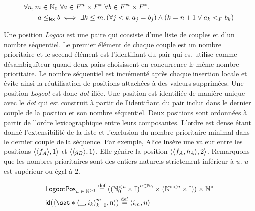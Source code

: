 \begin{equation*}\begin{split}
\MoveEqLeft \forall n, m \in \mathbb{N}_0\ \forall a \in F^n \times F^*\ \forall b \in F^m \times F^* \qsep\\
&a \leq_{\trm{lex}} b \iff \exists k \leq m \qsep (\forall j < k \qsep a_j = b_j) \land (k = n + 1 \lor a_k <_F b_k)
\end{split}\end{equation*}

Une position \emph{Logoot} est une paire qui consiste d'une liste de couples et d'un nombre séquentiel.
Le premier élément de chaque couple est un nombre prioritaire et le second élément est l'identifiant du pair qui est utilise comme désambiguïteur quand deux pairs choisissent en concurrence le même nombre prioritaire.
Le nombre séquentiel est incrémenté après chaque insertion locale et évite ainsi la réutilisation de positions attachées à des valeurs supprimées.
Une position \emph{Logoot} est donc \emph{dot}-ifiée.
Une position est identifiée de manière unique avec le \emph{dot} qui est construit à partir de l'identifiant du pair inclut dans le dernier couple de la position et son nombre séquentiel.
Deux positions sont ordonnées à partir de l'ordre lexicographique entre leurs composantes.
L'ordre est dense étant donné l'extensibilité de la liste et l'exclusion du nombre prioritaire minimal dans le dernier couple de la séquence.
Par exemple, Alice insère une valeur entre les positions $\tuple*{\tuple*{f_A}, 1}$ et $\tuple*{\tuple*{g_B}, 1}$.
Elle génère la position $\tuple*{\tuple*{f_A, h_A}, 2}$.
Remarquons que les nombres prioritaires sont des entiers naturels strictement inférieur à $u$.
$u$ est supérieur ou égal à $2$.

\begin{align}
&\trm{LogootPos}_{u\;\in\;\mathbb{N}^{> 1}} \defeq ({(\mathbb{N}_0^{< u} \times \mathbb{I})}^{n \in \mathbb{N}_0} \times (\mathbb{N}^{* < u} \times \mathbb{I})) \times \mathbb{N}^*\\
&\trm{id}(\tuple*{\set*{\tuple*{\_, i_k}}_{k=0}^m, \trm{n}}) \defeq \tuple*{i_m, n}
\end{align}

